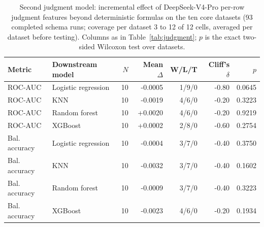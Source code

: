\begin{table}[htbp]
\caption{Second judgment model: incremental effect of DeepSeek-V4-Pro per-row judgment features beyond deterministic formulas on the ten core datasets (93 completed schema runs; coverage per dataset 3 to 12 of 12 cells, averaged per dataset before testing). Columns as in Table~\ref{tab:judgment}; $p$ is the exact two-sided Wilcoxon test over datasets.}\label{tab:judgment-v4pro}
\centering
\small
\begin{tabular}{llrrrrr}
\toprule
Metric & Downstream model & \(N\) & Mean \(\Delta\) & W/L/T & Cliff's \(\delta\) & \(p\) \\
\midrule
ROC-AUC & Logistic regression & 10 & -0.0005 & 1/9/0 & -0.80 & 0.0645 \\
ROC-AUC & KNN & 10 & -0.0019 & 4/6/0 & -0.20 & 0.3223 \\
ROC-AUC & Random forest & 10 & +0.0020 & 4/6/0 & -0.20 & 0.9219 \\
ROC-AUC & XGBoost & 10 & +0.0002 & 2/8/0 & -0.60 & 0.2754 \\
\midrule
Bal. accuracy & Logistic regression & 10 & -0.0004 & 3/7/0 & -0.40 & 0.3750 \\
Bal. accuracy & KNN & 10 & -0.0032 & 3/7/0 & -0.40 & 0.1602 \\
Bal. accuracy & Random forest & 10 & -0.0009 & 3/7/0 & -0.40 & 0.3223 \\
Bal. accuracy & XGBoost & 10 & -0.0023 & 4/6/0 & -0.20 & 0.1934 \\
\bottomrule
\end{tabular}
\end{table}
